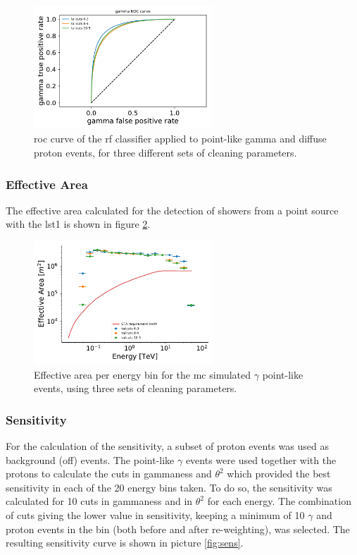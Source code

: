 \documentclass[main.tex]{subfiles}
\begin{document}
\begin{figure}
\centering
 \includegraphics[width=0.6\textwidth]{Pictures/ROC.pdf}
  \caption{\gls{roc} curve of the \gls{rf} classifier applied to point-like gamma and diffuse proton events, for three different sets of cleaning parameters.}
    \label{fig:roc}
\end{figure}

\subsubsection{Effective Area}

The effective area calculated for the detection of showers from a point source with the \gls{lst}1 is shown in figure \ref{fig:effarea}.  


\begin{figure}
\centering
 \includegraphics[width=0.6\textwidth]{Pictures/effective_area.pdf}
  \caption{Effective area per energy bin for the \gls{mc} simulated $\gamma$ point-like events, using three sets of cleaning parameters.}
    \label{fig:effarea}
\end{figure}

\subsubsection{Sensitivity}

For the calculation of the sensitivity, a subset of proton events was used as background (off) events. The point-like $\gamma$ events were used together with the protons to calculate the cuts in gammaness and $\theta^2$ which provided the best sensitivity in each of the 20 energy bins taken. To do so, the sensitivity was calculated for 10 cuts in gammaness and in $\theta^2$ for each energy. The combination of cuts giving the lower value in sensitivity, keeping a minimum of 10 $\gamma$ and proton events in the bin (both before and after re-weighting), was selected. The resulting sensitivity curve is shown in picture \ref{fig:sens}.   
\end{document}
